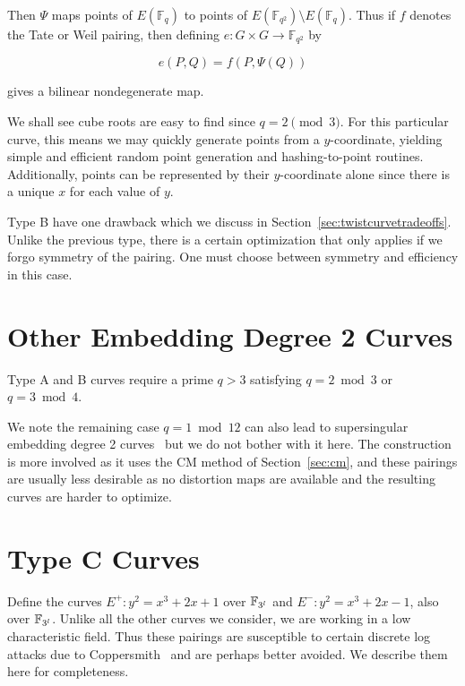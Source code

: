 Then $\Psi$ maps points of $E(\mathbb{F}_q)$ to points of
$E(\mathbb{F}_{q^2}) \setminus E(\mathbb{F}_q)$. Thus if $f$ denotes the
Tate or Weil pairing, then defining $e:G \times G \rightarrow \mathbb{F}_{q^2}$
by

\[ e(P,Q) = f(P, \Psi(Q)) \]

gives a bilinear nondegenerate map.

We shall see cube roots are easy to find since $q = 2 \pmod{3}$.
For this particular curve, this means we may quickly generate points from
a $y$-coordinate, yielding simple and efficient random point generation and
hashing-to-point routines.
Additionally,
points can be represented by their $y$-coordinate alone since there is
a unique $x$ for each value of $y$.

Type B have one drawback which we discuss in
Section~\ref{sec:twistcurvetradeoffs}. Unlike the previous type,
there is a certain optimization that
only applies if we forgo symmetry of the pairing. One must choose between
symmetry and efficiency in this case.

\section {Other Embedding Degree 2 Curves}

Type A and B curves require a prime $q > 3$ satisfying $q = 2 \bmod 3$ or
$q = 3 \bmod 4$.

We note the remaining case $q = 1 \bmod 12$ can also lead to supersingular
embedding degree 2 curves~\cite[\S 3.2]{fst} but we do not bother with it here.
The construction is more involved as it uses the CM method of
Section~\ref{sec:cm}, and these pairings are usually
less desirable as no distortion maps are available and the resulting
curves are harder to optimize.

\section {Type C Curves}

Define the curves $E^{+} : y^2 = x^3 + 2 x + 1$ over $\mathbb{F}_{3^l}$
and $E^{-} : y^2 = x^3 + 2 x - 1$, also over $\mathbb{F}_{3^l}$.
Unlike all the other curves we consider,
we are working in a low characteristic field. Thus these pairings
are susceptible to certain discrete log attacks due to
Coppersmith~\cite{coppersmith} and are perhaps better avoided.
We describe them here for completeness.

